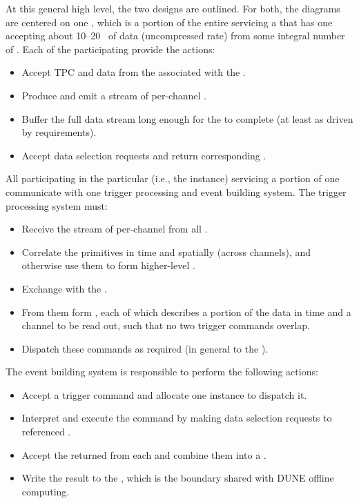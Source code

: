 At this general high level, the two designs are outlined. %
For both, the diagrams are %
centered on one 
, which is a portion of the entire  servicing a
 that has one  accepting about
\numrange{10}{20}~\si{\Gbps} of data (uncompressed rate) from some integral
number of . 
Each of the participating  provide the actions:
\begin{itemize}
\item Accept TPC and  data from the  associated with the .
\item Produce and emit a stream of per-channel .
\item Buffer the full data stream long enough for the  to complete (at least \snbpretime as driven by  requirements).
\item Accept data selection requests and return corresponding .
\end{itemize}

All participating  in the particular 
(i.e., the  instance) servicing a portion of one 
communicate with one trigger processing and event building system.
The trigger processing system must:
\begin{itemize}
\item Receive the stream of per-channel  from all .
\item Correlate the primitives in time and spatially (across channels), and otherwise use them to form higher-level .
\item Exchange  with the .
\item From them form , each of which describes a
  portion of the data in time and a channel to be read out, such that
  no two trigger commands overlap.
\item Dispatch these commands as required (in general to the ).
\end{itemize}
The event building system is responsible to perform the following actions:
\begin{itemize}
\item Accept a trigger command and allocate one  instance to dispatch it.
\item %
Interpret and execute the command by making
  data selection requests to referenced .
\item %
Accept the returned  from each
   and combine them into a .
\item Write the result to the , which is the boundary
  shared with DUNE offline computing.
\end{itemize}

